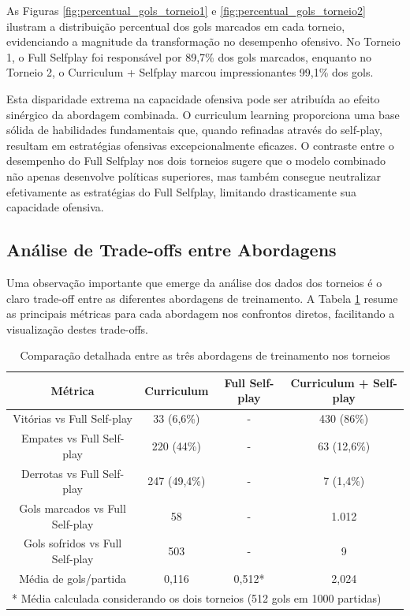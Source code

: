 As Figuras \ref{fig:percentual_gols_torneio1} e \ref{fig:percentual_gols_torneio2} ilustram a distribuição percentual dos gols marcados em cada torneio, evidenciando a magnitude da transformação no desempenho ofensivo. No Torneio 1, o Full Selfplay foi responsável por 89,7\% dos gols marcados, enquanto no Torneio 2, o Curriculum + Selfplay marcou impressionantes 99,1\% dos gols.

Esta disparidade extrema na capacidade ofensiva pode ser atribuída ao efeito sinérgico da abordagem combinada. O curriculum learning proporciona uma base sólida de habilidades fundamentais que, quando refinadas através do self-play, resultam em estratégias ofensivas excepcionalmente eficazes. O contraste entre o desempenho do Full Selfplay nos dois torneios sugere que o modelo combinado não apenas desenvolve políticas superiores, mas também consegue neutralizar efetivamente as estratégias do Full Selfplay, limitando drasticamente sua capacidade ofensiva.

\subsection{Análise de Trade-offs entre Abordagens}

Uma observação importante que emerge da análise dos dados dos torneios é o claro trade-off entre as diferentes abordagens de treinamento. A Tabela \ref{tab:comparacao_abordagens_detalhada} resume as principais métricas para cada abordagem nos confrontos diretos, facilitando a visualização destes trade-offs.

\begin{table}[H]
    \centering
    \begin{tabular}{|c|c|c|c|}
        \hline
        \textbf{Métrica} & \textbf{Curriculum} & \textbf{Full Self-play} & \textbf{Curriculum + Self-play} \\
        \hline
        Vitórias vs Full Self-play & 33 (6,6\%) & - & 430 (86\%) \\
        \hline
        Empates vs Full Self-play & 220 (44\%) & - & 63 (12,6\%) \\
        \hline
        Derrotas vs Full Self-play & 247 (49,4\%) & - & 7 (1,4\%) \\
        \hline
        Gols marcados vs Full Self-play & 58 & - & 1.012 \\
        \hline
        Gols sofridos vs Full Self-play & 503 & - & 9 \\
        \hline
        Média de gols/partida & 0,116 & 0,512* & 2,024 \\
        \hline
        \multicolumn{4}{|l|}{* Média calculada considerando os dois torneios (512 gols em 1000 partidas)} \\
        \hline
    \end{tabular}
    \caption{Comparação detalhada entre as três abordagens de treinamento nos torneios}
    \label{tab:comparacao_abordagens_detalhada}
\end{table}

